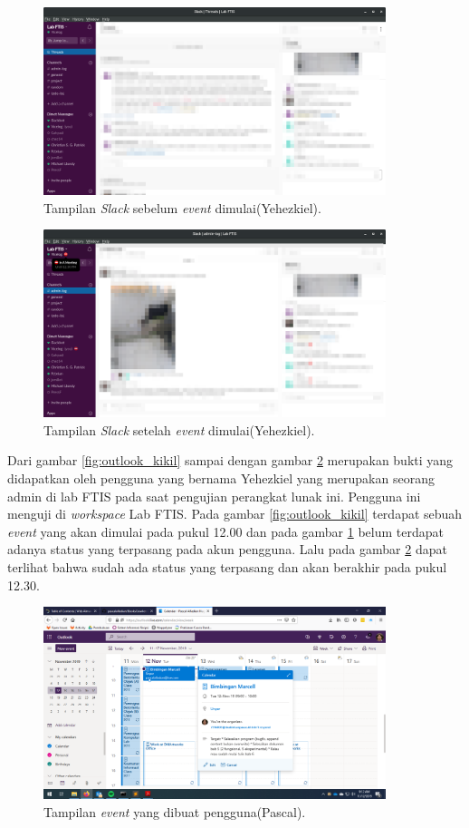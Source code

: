 \begin{figure}[h]
  \includegraphics[width=10cm]{./Gambar/PengujianKikil/Slack_Before.png}
  \centering
  \caption{Tampilan \textit{Slack} sebelum \textit{event} dimulai(Yehezkiel).}
  \label{fig:slack_before_kikil}
\end{figure}

\begin{figure}[h]
  \includegraphics[width=10cm]{./Gambar/PengujianKikil/Slack_After.png}
  \centering
  \caption{Tampilan \textit{Slack} setelah \textit{event} dimulai(Yehezkiel).}
  \label{fig:slack_after_kikil}
\end{figure}

Dari gambar \ref{fig:outlook_kikil} sampai dengan gambar \ref{fig:slack_after_kikil} merupakan bukti yang didapatkan oleh pengguna yang bernama Yehezkiel yang merupakan seorang admin di lab FTIS pada saat pengujian perangkat lunak ini. Pengguna ini menguji di \textit{workspace} Lab FTIS. Pada gambar \ref{fig:outlook_kikil} terdapat sebuah \textit{event} yang akan dimulai pada pukul 12.00 dan pada gambar \ref{fig:slack_before_kikil} belum terdapat adanya status yang terpasang pada akun pengguna. Lalu pada gambar \ref{fig:slack_after_kikil} dapat terlihat bahwa sudah ada status yang terpasang dan akan berakhir pada pukul 12.30. 
\clearpage

\begin{figure}[h]
  \includegraphics[width=10cm]{./Gambar/PengujianPaPascal/Outlook.png}
  \centering
  \caption{Tampilan \textit{event} yang dibuat pengguna(Pascal).}
  \label{fig:outlook_pascal}
\end{figure}

